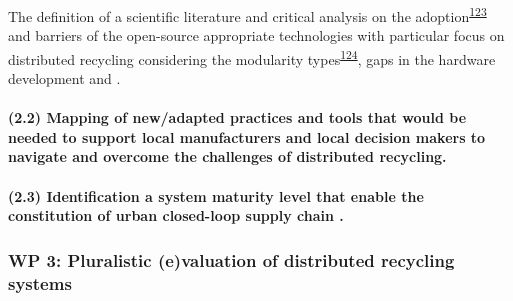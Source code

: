 \documentclass[
  12pt,
  a4paperpaper,
  onecolumn]{article}
\let\oldparagraph\paragraph
\renewcommand{\paragraph}[1]{\oldparagraph{#1}\mbox{}}
\let\paragraph\oldparagraph
\begin{document}
The definition of a scientific literature and critical analysis on the
adoption\textsuperscript{\protect\hyperlink{ref-reinauer2021}{123}} and
barriers of the open-source appropriate technologies with particular
focus on distributed recycling considering the modularity
types\textsuperscript{\protect\hyperlink{ref-gavras2021}{124}}, gaps in
the hardware development and .

\hypertarget{mapping-of-newadapted-practices-and-tools-that-would-be-needed-to-support-local-manufacturers-and-local-decision-makers-to-navigate-and-overcome-the-challenges-of-distributed-recycling.}{%
\paragraph{(2.2) Mapping of new/adapted practices and tools that would
be needed to support local manufacturers and local decision makers to
navigate and overcome the challenges of distributed
recycling.}\label{mapping-of-newadapted-practices-and-tools-that-would-be-needed-to-support-local-manufacturers-and-local-decision-makers-to-navigate-and-overcome-the-challenges-of-distributed-recycling.}}

\hypertarget{identification-a-system-maturity-level-that-enable-the-constitution-of-urban-closed-loop-supply-chain-.}{%
\paragraph{(2.3) Identification a system maturity level that enable the
constitution of urban closed-loop supply chain
.}\label{identification-a-system-maturity-level-that-enable-the-constitution-of-urban-closed-loop-supply-chain-.}}

\hypertarget{wp-3-pluralistic-evaluation-of-distributed-recycling-systems}{%
\subsubsection{WP 3: Pluralistic (e)valuation of distributed recycling
systems}\label{wp-3-pluralistic-evaluation-of-distributed-recycling-systems}}
\end{document}
